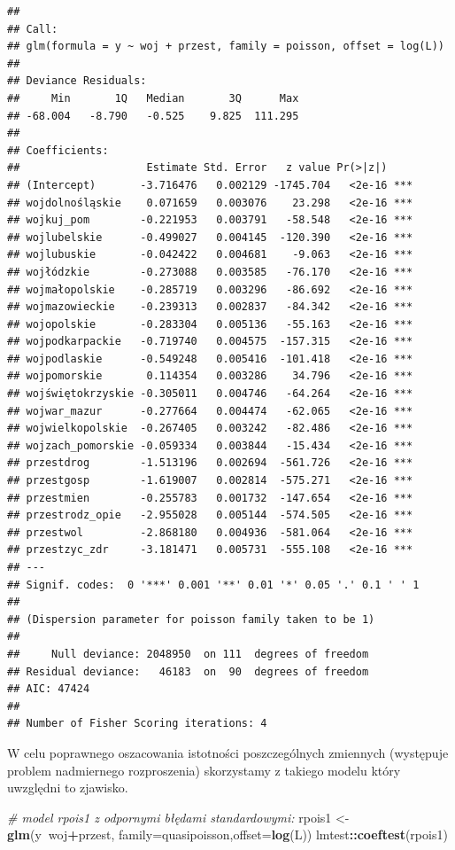 \documentclass[polish,]{book}
\newenvironment{Shaded}{\begin{snugshade}}{\end{snugshade}}
\newcommand{\CommentTok}[1]{\textcolor[rgb]{0.56,0.35,0.01}{\textit{#1}}}
\newcommand{\DataTypeTok}[1]{\textcolor[rgb]{0.13,0.29,0.53}{#1}}
\newcommand{\KeywordTok}[1]{\textcolor[rgb]{0.13,0.29,0.53}{\textbf{#1}}}
\newcommand{\NormalTok}[1]{#1}
\newcommand{\OperatorTok}[1]{\textcolor[rgb]{0.81,0.36,0.00}{\textbf{#1}}}
\newcommand{\StringTok}[1]{\textcolor[rgb]{0.31,0.60,0.02}{#1}}
\begin{document}
\begin{verbatim}
## 
## Call:
## glm(formula = y ~ woj + przest, family = poisson, offset = log(L))
## 
## Deviance Residuals: 
##     Min       1Q   Median       3Q      Max  
## -68.004   -8.790   -0.525    9.825  111.295  
## 
## Coefficients:
##                    Estimate Std. Error   z value Pr(>|z|)    
## (Intercept)       -3.716476   0.002129 -1745.704   <2e-16 ***
## wojdolnośląskie    0.071659   0.003076    23.298   <2e-16 ***
## wojkuj_pom        -0.221953   0.003791   -58.548   <2e-16 ***
## wojlubelskie      -0.499027   0.004145  -120.390   <2e-16 ***
## wojlubuskie       -0.042422   0.004681    -9.063   <2e-16 ***
## wojłódzkie        -0.273088   0.003585   -76.170   <2e-16 ***
## wojmałopolskie    -0.285719   0.003296   -86.692   <2e-16 ***
## wojmazowieckie    -0.239313   0.002837   -84.342   <2e-16 ***
## wojopolskie       -0.283304   0.005136   -55.163   <2e-16 ***
## wojpodkarpackie   -0.719740   0.004575  -157.315   <2e-16 ***
## wojpodlaskie      -0.549248   0.005416  -101.418   <2e-16 ***
## wojpomorskie       0.114354   0.003286    34.796   <2e-16 ***
## wojświętokrzyskie -0.305011   0.004746   -64.264   <2e-16 ***
## wojwar_mazur      -0.277664   0.004474   -62.065   <2e-16 ***
## wojwielkopolskie  -0.267405   0.003242   -82.486   <2e-16 ***
## wojzach_pomorskie -0.059334   0.003844   -15.434   <2e-16 ***
## przestdrog        -1.513196   0.002694  -561.726   <2e-16 ***
## przestgosp        -1.619007   0.002814  -575.271   <2e-16 ***
## przestmien        -0.255783   0.001732  -147.654   <2e-16 ***
## przestrodz_opie   -2.955028   0.005144  -574.505   <2e-16 ***
## przestwol         -2.868180   0.004936  -581.064   <2e-16 ***
## przestzyc_zdr     -3.181471   0.005731  -555.108   <2e-16 ***
## ---
## Signif. codes:  0 '***' 0.001 '**' 0.01 '*' 0.05 '.' 0.1 ' ' 1
## 
## (Dispersion parameter for poisson family taken to be 1)
## 
##     Null deviance: 2048950  on 111  degrees of freedom
## Residual deviance:   46183  on  90  degrees of freedom
## AIC: 47424
## 
## Number of Fisher Scoring iterations: 4
\end{verbatim}

W celu poprawnego oszacowania istotności poszczególnych zmiennych (występuje
problem nadmiernego rozproszenia) skorzystamy z takiego modelu który uwzględni
to zjawisko.

\begin{Shaded}
\begin{Highlighting}[]
\CommentTok{# model rpois1 z odpornymi błędami standardowymi:}
\NormalTok{rpois1 <-}\StringTok{ }\KeywordTok{glm}\NormalTok{(y}\OperatorTok{~}\NormalTok{woj}\OperatorTok{+}\NormalTok{przest, }\DataTypeTok{family=}\NormalTok{quasipoisson,}\DataTypeTok{offset=}\KeywordTok{log}\NormalTok{(L))}
\NormalTok{lmtest}\OperatorTok{::}\KeywordTok{coeftest}\NormalTok{(rpois1)}
\end{Highlighting}
\end{Shaded}
\end{document}
